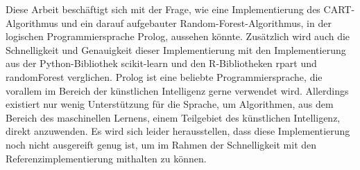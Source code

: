 Diese Arbeit beschäftigt sich mit der Frage, wie eine Implementierung des CART-Algorithmus und ein darauf aufgebauter
Random-Forest-Algorithmus, in der logischen Programmiersprache Prolog, aussehen könnte.
Zusätzlich wird auch die Schnelligkeit und Genauigkeit
dieser Implementierung mit den Implementierung aus der Python-Bibliothek scikit-learn und den R-Bibliotheken
rpart und randomForest verglichen.
Prolog ist eine beliebte Programmiersprache, die vorallem im Bereich der künstlichen Intelligenz
gerne verwendet wird. Allerdings existiert nur wenig Unterstützung für die Sprache, um Algorithmen,
aus dem Bereich des maschinellen Lernens, einem Teilgebiet des künstlichen Intelligenz, direkt anzuwenden.
Es wird sich leider herausstellen, dass diese Implementierung noch nicht ausgereift genug ist, um 
im Rahmen der Schnelligkeit mit den Referenzimplementierung mithalten zu können.